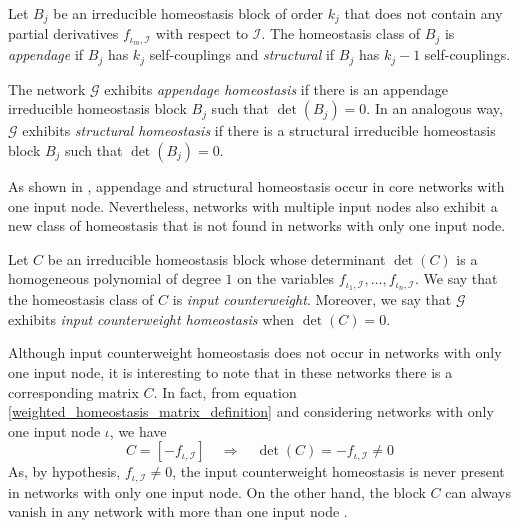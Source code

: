\documentclass[a4paper,fleqn]{cas-dc}
\begin{document}
\begin{definition} \label{definition_appendage_and_structural} \rm
Let $B_{j}$ be an irreducible homeostasis block of order $k_{j}$ that does not contain any partial derivatives $f_{\iota_{m}, \mathcal{I}}$ with respect to $\mathcal{I}$.
The homeostasis class of $B_{j}$ is \emph{appendage} if $B_{j}$ has $k_{j}$ self-couplings and \emph{structural} if $B_{j}$ has $k_{j} - 1$ self-couplings.
\end{definition}
 
\begin{definition} \label{types_homeostasis} \rm
The network $\mathcal{G}$ exhibits \emph{appendage homeostasis} if there is an appendage irreducible homeostasis block $B_{j}$ such that $\det(B_{j}) = 0$. 
In an analogous way, $\mathcal{G}$ exhibits \emph{structural homeostasis} if there is a structural irreducible homeostasis block $B_{j}$ such that $\det(B_{j}) = 0$.
\end{definition}

As shown in \cite{wang2021}, appendage and structural homeostasis occur in core networks with one input node. 
Nevertheless, networks with multiple input nodes also exhibit a new class of homeostasis that is not found in networks with only one input node.

\begin{definition} \rm
\label{definition_input_counterweight_homeostasis_block}
Let $C$ be an irreducible homeostasis block whose determinant $\det(C)$ is a homogeneous polynomial of degree $1$ on the variables $f_{\iota_{1}, \mathcal{I}}, \ldots, f_{\iota_{n}, \mathcal{I}}$. We say that the homeostasis class of $C$ is \emph{input counterweight}. Moreover, we say that $\mathcal{G}$ exhibits \emph{input counterweight homeostasis} when $\det(C) = 0$.
\end{definition}

Although input counterweight homeostasis does not occur in networks with only one input node, it is interesting to note that in these networks there is a corresponding matrix $C$. In fact, from equation \eqref{weighted_homeostasis_matrix_definition} and considering networks with only one input node $\iota$, we have
\begin{equation}
    C = [- f_{\iota, \mathcal{I}}] \quad\Rightarrow\quad 
    \det(C) = - f_{\iota, \mathcal{I}} \neq 0
\end{equation}
As, by hypothesis, $f_{\iota, \mathcal{I}} \neq 0$, the input counterweight homeostasis is never present in networks with only one input node.
On the other hand, the block $C$ can always vanish in any network with more than one input node \cite[Cor. 3.9]{madeira2022}.
\end{document}
